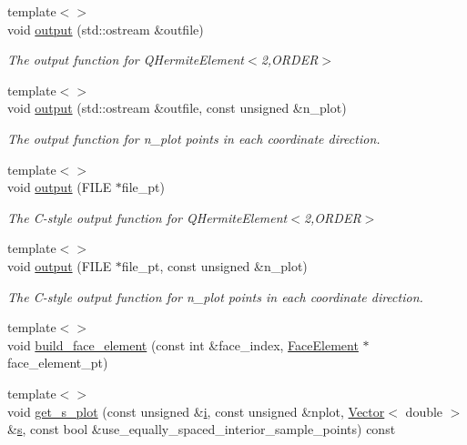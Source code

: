 \begin{DoxyCompactItemize}
\item 
{\footnotesize template$<$$>$ }\\void \hyperlink{classoomph_1_1QHermiteElement_ad324f863cc0ff28f4c1a6688e606a0bd}{output} (std\+::ostream \&outfile)
\begin{DoxyCompactList}\small\item\em The output function for Q\+Hermite\+Element$<$2,\+O\+R\+D\+E\+R$>$ \end{DoxyCompactList}\item 
{\footnotesize template$<$$>$ }\\void \hyperlink{classoomph_1_1QHermiteElement_a056485ca6e8d810dc64f871fc84dbde6}{output} (std\+::ostream \&outfile, const unsigned \&n\+\_\+plot)
\begin{DoxyCompactList}\small\item\em The output function for n\+\_\+plot points in each coordinate direction. \end{DoxyCompactList}\item 
{\footnotesize template$<$$>$ }\\void \hyperlink{classoomph_1_1QHermiteElement_a38db955b7d2f3fddf170db5af57cb714}{output} (F\+I\+LE $\ast$file\+\_\+pt)
\begin{DoxyCompactList}\small\item\em The C-\/style output function for Q\+Hermite\+Element$<$2,\+O\+R\+D\+E\+R$>$ \end{DoxyCompactList}\item 
{\footnotesize template$<$$>$ }\\void \hyperlink{classoomph_1_1QHermiteElement_a901e801649625708086312f1cba77147}{output} (F\+I\+LE $\ast$file\+\_\+pt, const unsigned \&n\+\_\+plot)
\begin{DoxyCompactList}\small\item\em The C-\/style output function for n\+\_\+plot points in each coordinate direction. \end{DoxyCompactList}\item 
{\footnotesize template$<$$>$ }\\void \hyperlink{classoomph_1_1QHermiteElement_a7e81604ac70e3adf1b82496fdbbc4348}{build\+\_\+face\+\_\+element} (const int \&face\+\_\+index, \hyperlink{classoomph_1_1FaceElement}{Face\+Element} $\ast$face\+\_\+element\+\_\+pt)
\item 
{\footnotesize template$<$$>$ }\\void \hyperlink{classoomph_1_1QHermiteElement_a5715822b33881a8d0cba7e6253624c97}{get\+\_\+s\+\_\+plot} (const unsigned \&\hyperlink{cfortran_8h_adb50e893b86b3e55e751a42eab3cba82}{i}, const unsigned \&nplot, \hyperlink{classoomph_1_1Vector}{Vector}$<$ double $>$ \&\hyperlink{cfortran_8h_ab7123126e4885ef647dd9c6e3807a21c}{s}, const bool \&use\+\_\+equally\+\_\+spaced\+\_\+interior\+\_\+sample\+\_\+points) const

\end{DoxyCompactItemize}
